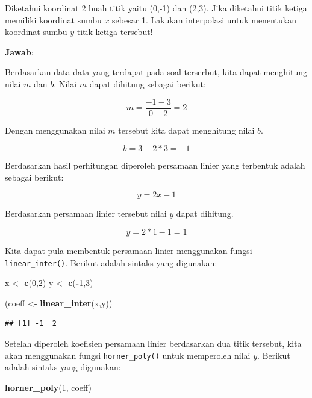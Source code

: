 \documentclass[]{book}
\newenvironment{Shaded}{\begin{snugshade}}{\end{snugshade}}
\newcommand{\DecValTok}[1]{\textcolor[rgb]{0.00,0.00,0.81}{#1}}
\newcommand{\KeywordTok}[1]{\textcolor[rgb]{0.13,0.29,0.53}{\textbf{#1}}}
\newcommand{\NormalTok}[1]{#1}
\newcommand{\OperatorTok}[1]{\textcolor[rgb]{0.81,0.36,0.00}{\textbf{#1}}}
\newcommand{\StringTok}[1]{\textcolor[rgb]{0.31,0.60,0.02}{#1}}
\theoremstyle{definition}
\theoremstyle{definition}
\theoremstyle{definition}
\theoremstyle{remark}
\let\BeginKnitrBlock\begin \let\EndKnitrBlock\end
\begin{document}
\BeginKnitrBlock{example}
\protect\hypertarget{exm:linterpexmp}{}{\label{exm:linterpexmp} }Diketahui koordinat 2 buah titik yaitu (0,-1) dan (2,3). Jika diketahui titik ketiga memiliki koordinat sumbu \(x\) sebesar 1. Lakukan interpolasi untuk menentukan koordinat sumbu \(y\) titik ketiga tersebut!
\EndKnitrBlock{example}

\textbf{Jawab}:

Berdasarkan data-data yang terdapat pada soal terserbut, kita dapat menghitung nilai \(m\) dan \(b\). Nilai \(m\) dapat dihitung sebagai berikut:

\[
m=\frac{-1-3}{0-2}=2
\]

Dengan menggunakan nilai \(m\) tersebut kita dapat menghitung nilai \(b\).

\[
b=3-2*3=-1
\]

Berdasarkan hasil perhitungan diperoleh persamaan linier yang terbentuk adalah sebagai berikut:

\[
y=2x-1
\]

Berdasarkan persamaan linier tersebut nilai \(y\) dapat dihitung.

\[
y=2*1-1=1
\]

Kita dapat pula membentuk persamaan linier menggunakan fungsi \texttt{linear\_inter()}. Berikut adalah sintaks yang digunakan:

\begin{Shaded}
\begin{Highlighting}[]
\NormalTok{x <-}\StringTok{ }\KeywordTok{c}\NormalTok{(}\DecValTok{0}\NormalTok{,}\DecValTok{2}\NormalTok{)}
\NormalTok{y <-}\StringTok{ }\KeywordTok{c}\NormalTok{(}\OperatorTok{-}\DecValTok{1}\NormalTok{,}\DecValTok{3}\NormalTok{)}

\NormalTok{(coeff <-}\StringTok{ }\KeywordTok{linear_inter}\NormalTok{(x,y))}
\end{Highlighting}
\end{Shaded}

\begin{verbatim}
## [1] -1  2
\end{verbatim}

Setelah diperoleh koefisien persamaan linier berdasarkan dua titik tersebut, kita akan menggunakan fungsi \texttt{horner\_poly()} untuk memperoleh nilai \(y\). Berikut adalah sintaks yang digunakan:

\begin{Shaded}
\begin{Highlighting}[]
\KeywordTok{horner_poly}\NormalTok{(}\DecValTok{1}\NormalTok{, coeff)}
\end{Highlighting}
\end{Shaded}
\end{document}
